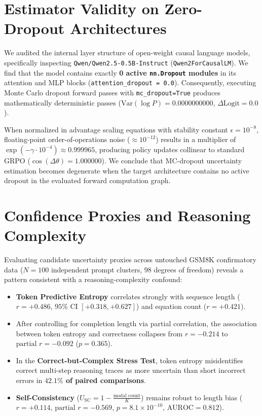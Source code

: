 \documentclass[journal]{IEEEtai}
\begin{document}
\section{Estimator Validity on Zero-Dropout Architectures}
We audited the internal layer structure of open-weight causal language models, specifically inspecting \texttt{Qwen/Qwen2.5-0.5B-Instruct} (\texttt{Qwen2ForCausalLM}). We find that the model contains exactly \textbf{0 active \texttt{nn.Dropout} modules} in its attention and MLP blocks (\texttt{attention\_dropout = 0.0}). Consequently, executing Monte Carlo dropout forward passes \cite{gal2016dropout} with \texttt{mc\_dropout=True} produces mathematically deterministic passes ($\text{Var}(\log P) = 0.0000000000$, $\Delta \text{Logit} = 0.0$). 

When normalized in advantage scaling equations with stability constant $\epsilon = 10^{-8}$, floating-point order-of-operations noise ($\approx 10^{-12}$) results in a multiplier of $\exp(-\gamma \cdot 10^{-4}) \approx 0.999965$, producing policy updates collinear to standard GRPO ($\cos(\Delta \theta) = 1.000000$). We conclude that MC-dropout uncertainty estimation becomes degenerate when the target architecture contains no active dropout in the evaluated forward computation graph.

\section{Confidence Proxies and Reasoning Complexity}
Evaluating candidate uncertainty proxies across untouched GSM8K confirmatory data ($N = 100$ independent prompt clusters, $98$ degrees of freedom) reveals a pattern consistent with a reasoning-complexity confound:
\begin{itemize}
    \item \textbf{Token Predictive Entropy} correlates strongly with sequence length ($r = +0.486$, $95\%$ CI $[+0.318, +0.627]$) and equation count ($r = +0.421$).
    \item After controlling for completion length via partial correlation, the association between token entropy and correctness collapses from $r = -0.214$ to $\text{partial } r = -0.092$ ($p = 0.365$).
    \item In the \textbf{Correct-but-Complex Stress Test}, token entropy misidentifies correct multi-step reasoning traces as more uncertain than short incorrect errors in \textbf{$42.1\%$ of paired comparisons}.
    \item \textbf{Self-Consistency} ($U_{\text{SC}} = 1 - \frac{\text{modal count}}{K}$) \cite{wang2023selfconsistency} remains robust to length bias ($r = +0.114$, $\text{partial } r = -0.569$, $p = 8.1 \times 10^{-10}$, $\text{AUROC} = 0.812$).
\end{itemize}
\end{document}
